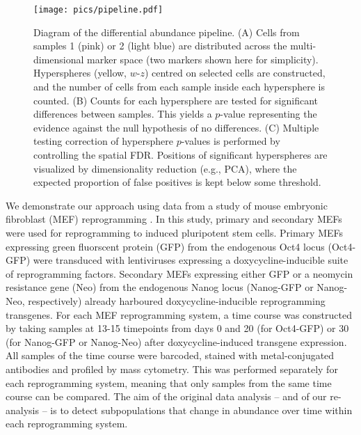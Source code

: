 \documentclass{article}
\begin{document}
\begin{figure}[bt]
\begin{center}
    \texttt{[image: pics/pipeline.pdf]}
\end{center}
\caption{Diagram of the differential abundance pipeline.
    (A) Cells from samples 1 (pink) or 2 (light blue) are distributed across the multi-dimensional marker space (two markers shown here for simplicity).
    Hyperspheres (yellow, $w$-$z$) centred on selected cells are constructed, and the number of cells from each sample inside each hypersphere is counted.
    (B) Counts for each hypersphere are tested for significant differences between samples.
    This yields a $p$-value representing the evidence against the null hypothesis of no differences.
    (C) Multiple testing correction of hypersphere $p$-values is performed by controlling the spatial FDR.
    Positions of significant hyperspheres are visualized by dimensionality reduction (e.g., PCA), where the expected proportion of false positives is kept below some threshold.
}
\label{fig:overview}
\end{figure}

We demonstrate our approach using data from a study of mouse embryonic fibroblast (MEF) reprogramming \cite{zunder2015continuous}.
In this study, primary and secondary MEFs were used for reprogramming to induced pluripotent stem cells.
Primary MEFs expressing green fluorscent protein (GFP) from the endogenous Oct4 locus (Oct4-GFP) were transduced with lentiviruses expressing a doxycycline-inducible suite of reprogramming factors.
Secondary MEFs expressing either GFP or a neomycin resistance gene (Neo) from the endogenous Nanog locus (Nanog-GFP or Nanog-Neo, respectively) already harboured doxycycline-inducible reprogramming transgenes.
For each MEF reprogramming system, a time course was constructed by taking samples at 13-15 timepoints from days 0 and 20 (for Oct4-GFP) or 30 (for Nanog-GFP or Nanog-Neo) after doxycycline-induced transgene expression.
All samples of the time course were barcoded, stained with metal-conjugated antibodies and profiled by mass cytometry.
This was performed separately for each reprogramming system, meaning that only samples from the same time course can be compared.
The aim of the original data analysis -- and of our re-analysis -- is to detect subpopulations that change in abundance over time within each reprogramming system.
\end{document}
